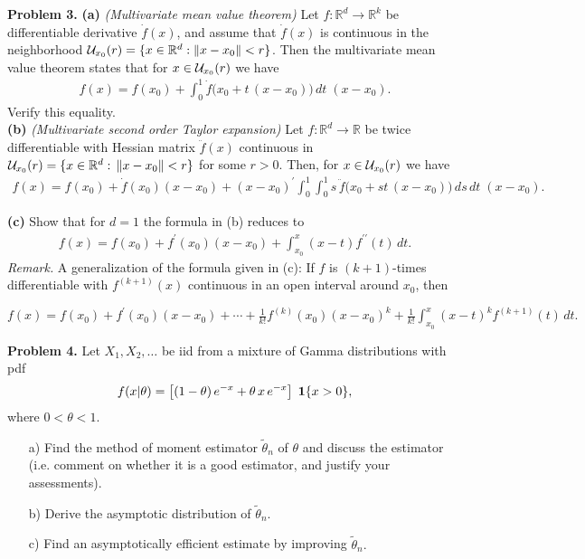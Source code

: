 \documentclass[12pt]{exam}
\newcommand{\R}{{\mathbb R}}
\begin{document}
\vspace*{1cm}

\noindent
{\bf Problem 3.} {\bf (a)} {\em (Multivariate mean value theorem)} Let $f:{\mathbb R}^d \to {\mathbb R}^k$ be differentiable derivative $\dot{f}(x)$, and assume that $
\dot{f} (x)$ is continuous in the neighborhood ${\cal U}_{x_0}(r) = \{x \in \R^d: \|x - x_0\| < r\}$. Then the multivariate mean value theorem states that for $x\in {\cal U}_{x_0}(r)$ we have
%
\begin{align*}
f(x) = f(x_0) + \int_0^1 \dot{f}\big(x_0 + t\,(x - x_0)\big)\,dt\;(x - x_0).
\end{align*}
%
Verify this equality.\\

\noindent
{\bf (b)} {\em (Multivariate second order Taylor expansion)} Let $f: \R^d \to \R$ be twice differentiable with Hessian matrix $\ddot{f}(x)$ continuous in ${\cal U}_{x_0}(r) = \{x \in \R^d:\,\|x - x_0\| < r\}$ for some $r > 0$. Then, for $x \in {\cal U}_{x_0}(r)$ we have
%
\begin{align*}
f(x) = f(x_0) + \dot{f}(x_0) (x - x_0) + (x - x_0)^\prime \int_0^1 \int_0^1 s\,\ddot{f}(x_0 + st\,(x- x_0)\big)\,ds\,dt\;(x - x_0).
\end{align*}

\noindent
{\bf (c)} Show that for $d = 1$ the formula in (b) reduces to
%
\begin{align*}
f(x) = f(x_0) + f^\prime(x_0) (x - x_0) + \int_{x_0}^x (x - t) f^{\prime\prime}(t)\,dt.
\end{align*}
%
{\em Remark.} A generalization of the formula given in (c): If $f$ is $(k+1)$-times differentiable with $f^{(k+1)}(x)$ continuous in an open interval around $x_0$, then \\[5pt] 
%
\centerline{ $f(x) = f(x_0) + f^\prime(x_0) (x - x_0) + \cdots + \frac{1}{k!}f^{(k)}(x_0)(x-x_0)^k + \frac{1}{k!}\int_{x_0}^x (x - t)^k f^{(k+1)}(t)\,dt.$}
\vspace*{1cm}

\noindent
{\bf Problem 4.} Let $X_1, X_2,\ldots$ be iid from a mixture of Gamma
distributions with pdf
%
$$ f(x|\theta) = \left[(1-\theta)\,e^{-x} + \theta\,x\,e^{-x}
\right]\;{\bf 1}\{x > 0\},$$
%
where $0 < \theta < 1.$
%
\begin{itemize}
\item[a)] Find the method of moment estimator $\tilde{\theta}_n$ of $\theta$ and discuss the estimator (i.e. comment on whether it is a good estimator, and justify your assessments). 
%
\item[b)] Derive the asymptotic distribution of $\tilde{\theta}_n.$
%
\item[c)] Find an asymptotically efficient estimate by improving
$\tilde{\theta}_n.$
\end{itemize}
\end{document}
